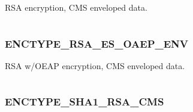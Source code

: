 \documentclass[letterpaper,10pt,english]{sphinxmanual}
\begin{document}
\begin{fulllineitems}
\label{appdev/refs/macros/ENCTYPE_RSA_ENV:ENCTYPE_RSA_ENV}
\end{fulllineitems}


RSA encryption, CMS enveloped data.

\begin{tabulary}{\linewidth}{|L|L|}
\hline

 & 
\\\hline
\end{tabulary}



\subsubsection{ENCTYPE\_RSA\_ES\_OAEP\_ENV}
\label{appdev/refs/macros/ENCTYPE_RSA_ES_OAEP_ENV::doc}\label{appdev/refs/macros/ENCTYPE_RSA_ES_OAEP_ENV:enctype-rsa-es-oaep-env}\label{appdev/refs/macros/ENCTYPE_RSA_ES_OAEP_ENV:enctype-rsa-es-oaep-env-data}

\begin{fulllineitems}
\label{appdev/refs/macros/ENCTYPE_RSA_ES_OAEP_ENV:ENCTYPE_RSA_ES_OAEP_ENV}
\end{fulllineitems}


RSA w/OEAP encryption, CMS enveloped data.

\begin{tabulary}{\linewidth}{|L|L|}
\hline

 & 
\\\hline
\end{tabulary}



\subsubsection{ENCTYPE\_SHA1\_RSA\_CMS}
\label{appdev/refs/macros/ENCTYPE_SHA1_RSA_CMS::doc}\label{appdev/refs/macros/ENCTYPE_SHA1_RSA_CMS:enctype-sha1-rsa-cms-data}\label{appdev/refs/macros/ENCTYPE_SHA1_RSA_CMS:enctype-sha1-rsa-cms}

\begin{fulllineitems}
\label{appdev/refs/macros/ENCTYPE_SHA1_RSA_CMS:ENCTYPE_SHA1_RSA_CMS}
\end{fulllineitems}
\end{document}
